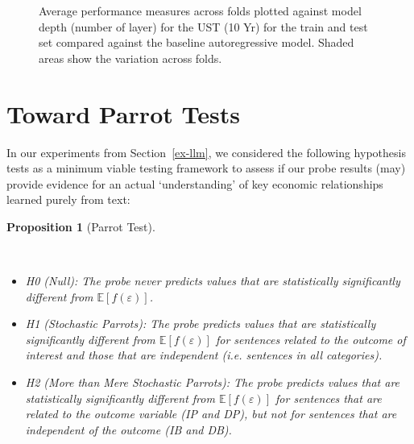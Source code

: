 \documentclass{article}
\theoremstyle{plain}
\newtheorem{proposition}[theorem]{Proposition}
\theoremstyle{definition}
\theoremstyle{remark}
\begin{document}

\begin{figure}


\caption{\label{fig-ust-10-b}Average performance measures across folds plotted against model depth (number of layer) for the UST (10 Yr) for the train and test set compared against the baseline autoregressive model. Shaded areas show the variation across folds.}

\end{figure}%

\section{Toward Parrot Tests}\label{appendix:parrot}

In our experiments from Section~\ref{ex-llm}, we considered the following hypothesis tests as a minimum viable testing framework to assess if our probe results (may) provide evidence for an actual `understanding' of key economic relationships learned purely from text:

\begin{proposition}[Parrot
Test]\protect\hypertarget{prp-line}{}\label{prp-line}

~

\begin{itemize}
\setlength\itemsep{1px}
\item
  \emph{H0 (Null)}: The probe never predicts values that are statistically significantly different from \(\mathbb{E}[f(\varepsilon)]\).
\item
  \emph{H1 (Stochastic Parrots)}: The probe predicts values that are statistically significantly different from \(\mathbb{E}[f(\varepsilon)]\) for sentences related to the outcome of interest \emph{and} those that are independent (i.e. sentences in all categories).
\item
  \emph{H2 (More than Mere Stochastic Parrots)}: The probe predicts values that are statistically significantly different from \(\mathbb{E} [f(\varepsilon)]\) for sentences that are related to the outcome variable (IP and DP), but not for sentences that are independent of the outcome (IB and DB).
\end{itemize}
\end{proposition}
\end{document}
